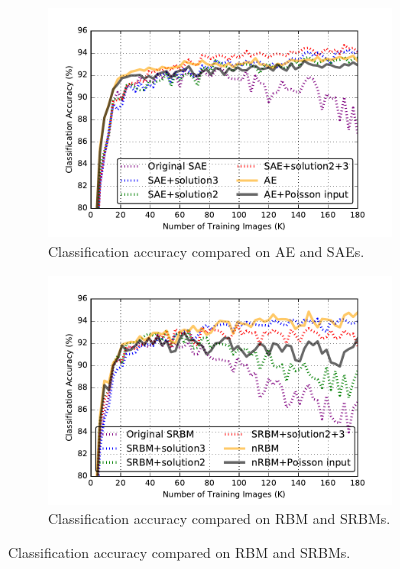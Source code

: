 \begin{figure}
	\centering
	\begin{subfigure}[t]{0.45\textwidth}
		\includegraphics[width=\textwidth]{pics_sdlm/43_MNIST_SAE_all/compare_result.pdf}
		\caption{Classification accuracy compared on AE and SAEs.}
	\end{subfigure}
	\begin{subfigure}[t]{0.45\textwidth}
		\includegraphics[width=\textwidth]{pics_sdlm/53_MNIST_SRBM_all/compare_result.pdf}
		\caption{Classification accuracy compared on RBM and SRBMs.}
	\end{subfigure}
\end{figure}


